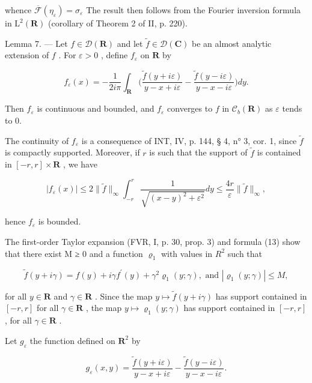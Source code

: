 whence \(\overline{\mathcal{F}}(\eta_{\varepsilon}) = \sigma_{\varepsilon}\) The result then follows from the Fourier inversion formula in \(\mathrm{L}^2(\mathbf{R})\) (corollary of Theorem 2 of II, p. 220).

Lemma 7. --- Let \(f \in \mathcal{D}(\mathbf{R})\) and let \(\widetilde{f} \in \mathcal{D}(\mathbf{C})\) be an almost analytic extension of \(f\) . For \(\varepsilon > 0\) , define \(f_{\varepsilon}\) on \(\mathbf{R}\) by

\[
f _ {\varepsilon} (x) = - \frac {1}{2 i \pi} \int_ {\mathbf {R}} \biggl (\frac {\widetilde {f} (y + i \varepsilon)}{y - x + i \varepsilon} - \frac {\widetilde {f} (y - i \varepsilon)}{y - x - i \varepsilon} \biggr) d y.
\]

Then \(f_{\varepsilon}\) is continuous and bounded, and \(f_{\varepsilon}\) converges to \(f\) in \(\mathcal{C}_b(\mathbf{R})\) as \(\varepsilon\) tends to 0.

The continuity of \(f_{\varepsilon}\) is a consequence of INT, IV, p. 144, § 4, n° 3, cor. 1, since \(\widetilde{f}\) is compactly supported. Moreover, if \(r\) is such that the support of \(\widetilde{f}\) is contained in \([-r, r] \times \mathbf{R}\) , we have

\[
| f _ {\varepsilon} (x) | \leqslant 2 \| \widetilde {f} \| _ {\infty} \int_ {- r} ^ {r} \frac {1}{\sqrt {(x - y) ^ {2} + \varepsilon^ {2}}} d y \leqslant \frac {4 r}{\varepsilon} \| \widetilde {f} \| _ {\infty},
\]

hence \(f_{\varepsilon}\) is bounded.

The first-order Taylor expansion (FVR, I, p. 30, prop. 3) and formula (13) show that there exist M ≥ 0 and a function \(\varrho_{1}\) with values in \(R^{2}\) such that

\[
\widetilde {f} (y + i \gamma) = f (y) + i \gamma f ^ {\prime} (y) + \gamma^ {2} \varrho_ {1} (y; \gamma), \text {   and   } | \varrho_ {1} (y; \gamma) | \leqslant M,
\]

for all \(y \in \mathbf{R}\) and \(\gamma \in \mathbf{R}\) . Since the map \(y \mapsto \widetilde{f}(y + i\gamma)\) has support contained in \([-r, r]\) for all \(\gamma \in \mathbf{R}\) , the map \(y \mapsto \varrho_{1}(y; \gamma)\) has support contained in \([-r, r]\) , for all \(\gamma \in \mathbf{R}\) .

Let \(g_{\varepsilon}\) the function defined on \(\mathbf{R}^2\) by

\[
g _ {\varepsilon} (x, y) = \frac {\widetilde {f} (y + i \varepsilon)}{y - x + i \varepsilon} - \frac {\widetilde {f} (y - i \varepsilon)}{y - x - i \varepsilon}.
\]

